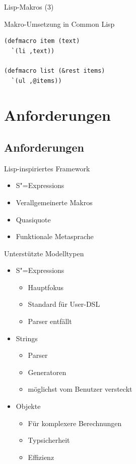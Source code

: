 \documentclass{beamer}
\newcommand{\pfeil}{\item[$\Rightarrow$]}
\newcommand{\sexps}{S"=Expressions}
\begin{document}
\begin{frame}[fragile]{Lisp-Makros (3)}
  \begin{block}{Makro-Umsetzung in Common Lisp}
\begin{verbatim}
(defmacro item (text)
  `(li ,text))

(defmacro list (&rest items)
  `(ul ,@items))
\end{verbatim}
  \end{block}
\end{frame}

\section{Anforderungen}
\subsection{Anforderungen}

\begin{frame}{Lisp-inspiriertes Framework}
  \begin{itemize}
  \item \sexps{}
  \item Verallgemeinerte Makros
  \item Quasiquote
  \item Funktionale Metasprache
  \end{itemize}
\end{frame}

\begin{frame}{Unterstützte Modelltypen}
  \begin{itemize}
  \item \sexps{}
    \begin{itemize}
    \item Hauptfokus
    \item Standard für User-DSL
    \pfeil Parser entfällt 
    \end{itemize}
  \item Strings
    \begin{itemize}
    \item Parser
    \item Generatoren
    \item möglichst vom Benutzer versteckt
    \end{itemize}
  \item Objekte
    \begin{itemize}
    \item Für komplexere Berechnungen
    \item Typsicherheit
    \item Effizienz
    \end{itemize}
  \end{itemize}
\end{frame}
\end{document}
